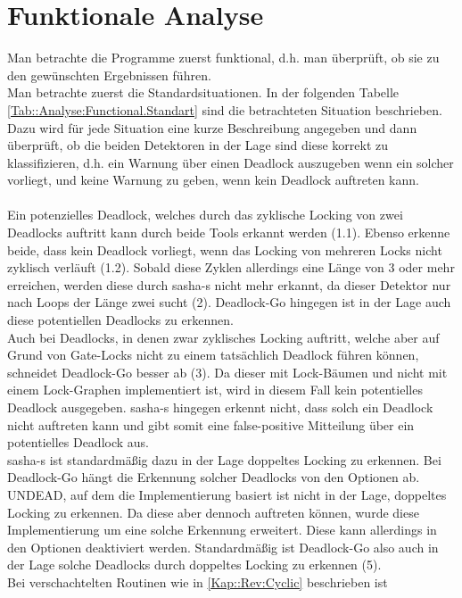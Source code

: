 \section{Funktionale Analyse}
Man betrachte die Programme zuerst funktional, d.h. man überprüft, ob sie zu den 
gewünschten Ergebnissen führen.\\
Man betrachte zuerst die Standardsituationen. In der folgenden Tabelle 
\ref{Tab::Analyse:Functional.Standart} sind die 
betrachteten Situation beschrieben. Dazu wird für jede Situation eine kurze 
Beschreibung angegeben und dann überprüft, ob die beiden Detektoren in der Lage 
sind diese korrekt zu klassifizieren, d.h. ein Warnung über einen Deadlock auszugeben
wenn ein solcher vorliegt, und keine Warnung zu geben, wenn kein Deadlock auftreten
kann.\\\\
Ein potenzielles Deadlock, welches 
durch das zyklische Locking von zwei Deadlocks auftritt kann durch beide Tools
erkannt werden (1.1). Ebenso erkenne beide, dass kein Deadlock vorliegt, wenn das 
Locking von mehreren Locks nicht zyklisch verläuft (1.2).
Sobald diese Zyklen allerdings eine Länge von 3 oder mehr 
erreichen, werden diese durch sasha-s nicht mehr erkannt, da dieser 
Detektor nur nach Loops der Länge zwei sucht (2). Deadlock-Go 
hingegen ist in der Lage auch diese potentiellen Deadlocks zu erkennen.\\
Auch bei Deadlocks, in denen zwar zyklisches Locking auftritt, welche aber 
auf Grund von Gate-Locks nicht zu einem tatsächlich Deadlock führen können,
schneidet Deadlock-Go besser ab (3). Da dieser mit Lock-Bäumen und nicht mit einem
Lock-Graphen implementiert ist, wird in diesem Fall kein potentielles Deadlock 
ausgegeben. sasha-s hingegen erkennt nicht, dass solch ein Deadlock nicht 
auftreten kann und gibt somit eine false-positive Mitteilung über ein potentielles 
Deadlock aus.\\ 
sasha-s ist standardmäßig dazu in  der Lage doppeltes Locking zu erkennen.
Bei Deadlock-Go hängt die Erkennung solcher Deadlocks von den Optionen ab.
UNDEAD, auf dem die Implementierung basiert ist nicht in der Lage, doppeltes 
Locking zu erkennen. Da diese aber dennoch auftreten können, wurde diese 
Implementierung um eine solche Erkennung erweitert. Diese kann allerdings 
in den Optionen deaktiviert werden. Standardmäßig ist Deadlock-Go also auch in 
der Lage solche Deadlocks durch doppeltes Locking zu erkennen (5). \\ 
Bei verschachtelten Routinen wie in \ref{Kap::Rev:Cyclic} beschrieben ist 

